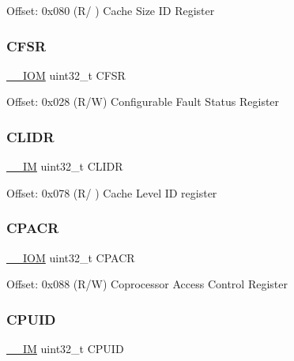 Offset\+: 0x080 (R/ ) Cache Size ID Register \mbox{\label{struct_s_c_b___type_a0f9e27357254e6e953a94f95bda040b1}} 
\subsubsection{\texorpdfstring{C\+F\+SR}{CFSR}}
{\footnotesize\ttfamily \mbox{\hyperlink{core__cm4_8h_ab6caba5853a60a17e8e04499b52bf691}{\+\_\+\+\_\+\+I\+OM}} uint32\+\_\+t C\+F\+SR}

Offset\+: 0x028 (R/W) Configurable Fault Status Register \mbox{\label{struct_s_c_b___type_a40b4dc749a25d1c95c2125e88683a591}} 
\subsubsection{\texorpdfstring{C\+L\+I\+DR}{CLIDR}}
{\footnotesize\ttfamily \mbox{\hyperlink{core__cm4_8h_a4cc1649793116d7c2d8afce7a4ffce43}{\+\_\+\+\_\+\+IM}} uint32\+\_\+t C\+L\+I\+DR}

Offset\+: 0x078 (R/ ) Cache Level ID register \mbox{\label{struct_s_c_b___type_ab8e9dd6ca5f31244ea352ed0c19155d8}} 
\subsubsection{\texorpdfstring{C\+P\+A\+CR}{CPACR}}
{\footnotesize\ttfamily \mbox{\hyperlink{core__cm4_8h_ab6caba5853a60a17e8e04499b52bf691}{\+\_\+\+\_\+\+I\+OM}} uint32\+\_\+t C\+P\+A\+CR}

Offset\+: 0x088 (R/W) Coprocessor Access Control Register \mbox{\label{struct_s_c_b___type_adbf8292503748ba6421a523bdee6819d}} 
\subsubsection{\texorpdfstring{C\+P\+U\+ID}{CPUID}}
{\footnotesize\ttfamily \mbox{\hyperlink{core__cm4_8h_a4cc1649793116d7c2d8afce7a4ffce43}{\+\_\+\+\_\+\+IM}} uint32\+\_\+t C\+P\+U\+ID}

